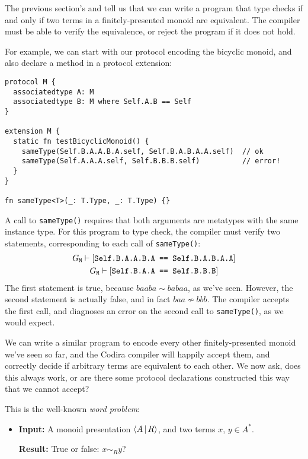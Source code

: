 \documentclass[../generics]{subfiles}
\begin{document}
The previous section's  and  tell us that we can write a program that type checks if and only if two terms in a finitely-presented monoid are equivalent. The compiler must be able to verify the equivalence, or reject the program if it does not hold.

For example, we can start with our protocol encoding the bicyclic monoid, and also declare a method in a protocol extension:
\begin{Verbatim}
protocol M {
  associatedtype A: M
  associatedtype B: M where Self.A.B == Self
}

extension M {
  static fn testBicyclicMonoid() {
    sameType(Self.B.A.A.B.A.self, Self.B.A.B.A.A.self)  // ok
    sameType(Self.A.A.A.self, Self.B.B.B.self)          // error!
  }
}

fn sameType<T>(_: T.Type, _: T.Type) {}
\end{Verbatim}
A call to \texttt{sameType()} requires that both arguments are metatypes with the same instance type. For this program to type check, the compiler must verify two statements, corresponding to each call of \texttt{sameType()}:
\begin{gather*}
G_\texttt{M}\vdash[\texttt{Self.B.A.A.B.A == Self.B.A.B.A.A}]\\
G_\texttt{M}\vdash[\texttt{Self.B.A.A == Self.B.B.B}]
\end{gather*}
The first statement is true, because $baaba\sim babaa$, as we've seen. However, the second statement is actually false, and in fact $baa\not\sim bbb$. The compiler accepts the first call, and diagnoses an error on the second call to \texttt{sameType()}, as we would expect.

We can write a similar program to encode every other finitely-presented monoid we've seen so far, and the Codira compiler will happily accept them, and correctly decide if arbitrary terms are equivalent to each other. We now ask, does this always work, or are there some protocol declarations constructed this way that we cannot accept?

This is the well-known \emph{word problem}:
\begin{itemize}
\item
\textbf{Input:} A monoid presentation $\langle A\,|\,R\rangle$, and two terms $x$, $y\in A^*$.

\textbf{Result:} True or false: $x\sim_R y$?
\end{itemize}
\end{document}
